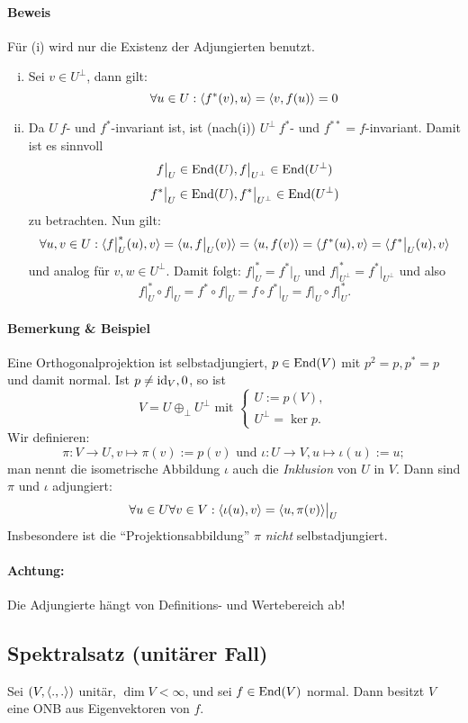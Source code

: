 \paragraph{Beweis}
	Für (i) wird nur die Existenz der Adjungierten benutzt.
		\begin{enumerate}[(i)]
			\item Sei $ v\in U^\perp $, dann gilt:
				\[ \forall u\in U: \langle f^*(v),u \rangle = \langle v,f(u) \rangle = 0 \]
			\item Da $ U\ f $- und $ f^* $-invariant ist, ist (nach(i)) $ U^\perp\ f^*$- und $ f^{**} = f $-invariant.		
			Damit ist es sinnvoll
				\[ f\big|_U \in \operatorname{End}(U), f\big|_{U^\perp}\in \operatorname{End}(U^\perp) \]
				\[ f^*\big|_U\in \operatorname{End}(U), f^*\big|_{U^\perp}\in \operatorname{End}(U^\perp) \]
			zu betrachten. Nun gilt:
				\[ \forall u,v\in U: \langle f\big|_U^*(u),v \rangle = \langle u,f\big|_U(v) \rangle = \langle u,f(v) \rangle = \langle f^*(u),v \rangle = \langle f^*\big|_U(u),v \rangle \]
			und analog für $ v,w\in U^\perp $. Damit folgt: $ f\big|_U^* = f^*\big|_U $ und $ f\big|^*_{U^\perp} = f^*\big|_{U^\perp}$ und also
				\[ f\big|_U^* \circ f\big|_U = f^*\circ f\big|_U = f\circ f^*\big|_U = f\big|_U \circ f\big|_U^*. \]
		\end{enumerate}
\paragraph{Bemerkung \& Beispiel}
	 Eine Orthogonalprojektion ist selbstadjungiert, $ p\in \operatorname{End}(V) $ mit $ p^2=p, p^*=p $ und damit normal. Ist $ p\neq \operatorname{id}_V, 0 $, so ist
		 \[ V=U\oplus_\perp U^\perp \text{ mit }
			 \begin{cases}
			 U:= p(V),\\ U^\perp = \ker p.
			 \end{cases} \]
	Wir definieren:
		\[ \pi:V\to U, v\mapsto \pi(v):= p(v) \text{ und } \iota : U\to V, u\mapsto \iota(u):= u; \]
	man nennt die isometrische Abbildung $ \iota $ auch die \emph{Inklusion} von $ U $ in $ V $. Dann sind $ \pi $ und $ \iota $ adjungiert:
		\[ \forall u\in U\forall v\in V: \langle \iota(u),v \rangle = \langle u,\pi(v) \rangle\big|_U \]
	Insbesondere ist die "`Projektionsabbildung"' $ \pi $ \emph{nicht} selbstadjungiert.
\paragraph{Achtung:}
	Die Adjungierte hängt von Definitions- und Wertebereich ab!
	
\subsection{Spektralsatz (unitärer Fall)}
\begin{Satz}[Spektralsatz]
	Sei $ (V,\langle .,. \rangle) $ unitär, $ \dim V<\infty $, und sei $ f\in \operatorname{End}(V) $ normal. Dann besitzt $ V $ eine ONB aus Eigenvektoren von $ f $.
\end{Satz}
